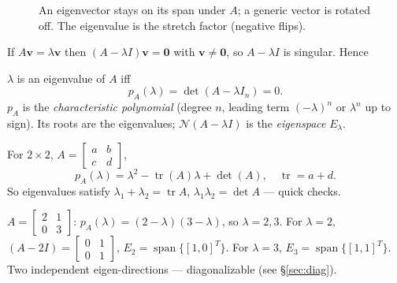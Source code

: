 \begin{figure}[h]
\centering
{}
\caption{An eigenvector stays on its span under $A$; a generic vector is rotated off. The eigenvalue is the stretch factor (negative flips).}
\label{fig:eigen-direction}
\end{figure}

If $A\mathbf{v}=\lambda\mathbf{v}$ then $(A-\lambda I)\mathbf{v}=\mathbf{0}$ with $\mathbf{v}\neq\mathbf{0}$, so $A-\lambda I$ is singular. Hence

\begin{theorem}
$\lambda$ is an eigenvalue of $A$ iff
\[
  p_A(\lambda)=\det(A-\lambda I_n)=0.
\]
$p_A$ is the \emph{characteristic polynomial} (degree $n$, leading term $(-\lambda)^n$ or $\lambda^n$ up to sign). Its roots are the eigenvalues; $\mathcal{N}(A-\lambda I)$ is the \emph{eigenspace} $E_\lambda$.
\end{theorem}

For $2\times2$, $A=\begin{bmatrix}a&b\\c&d\end{bmatrix}$,
\[
  p_A(\lambda)=\lambda^2-\operatorname{tr}(A)\lambda+\det(A),\quad \operatorname{tr}=a+d.
\]
So eigenvalues satisfy $\lambda_1+\lambda_2=\operatorname{tr}A$, $\lambda_1\lambda_2=\det A$ --- quick checks.

\begin{example}
$A=\begin{bmatrix}2&1\\0&3\end{bmatrix}$: $p_A(\lambda)=(2-\lambda)(3-\lambda)$, so $\lambda=2,3$. For $\lambda=2$, $(A-2I)=\begin{bmatrix}0&1\\0&1\end{bmatrix}$, $E_2=\operatorname{span}\{[1,0]^T\}$. For $\lambda=3$, $E_3=\operatorname{span}\{[1,1]^T\}$. Two independent eigen-directions --- diagonalizable (see \S\ref{sec:diag}).
\end{example}

